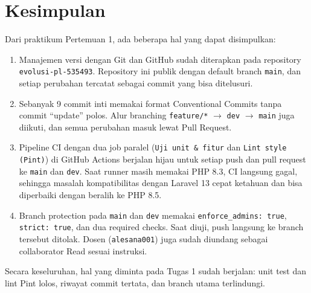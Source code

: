 \documentclass[a4paper,oneside,12pt]{report}
\begin{document}
\clearpage

\chapter{Kesimpulan}
Dari praktikum Pertemuan 1, ada beberapa hal yang dapat disimpulkan:

\begin{enumerate}
    \item Manajemen versi dengan Git dan GitHub sudah diterapkan pada repository \texttt{evolusi-pl-535493}. Repository ini publik dengan default branch \texttt{main}, dan setiap perubahan tercatat sebagai commit yang bisa ditelusuri.
    \item Sebanyak 9 commit inti memakai format Conventional Commits tanpa commit ``update'' polos. Alur branching \texttt{feature/*} $\rightarrow$ \texttt{dev} $\rightarrow$ \texttt{main} juga diikuti, dan semua perubahan masuk lewat Pull Request.
    \item Pipeline CI dengan dua job paralel (\texttt{Uji unit \& fitur} dan \texttt{Lint style (Pint)}) di GitHub Actions berjalan hijau untuk setiap push dan pull request ke \texttt{main} dan \texttt{dev}. Saat runner masih memakai PHP 8.3, CI langsung gagal, sehingga masalah kompatibilitas dengan Laravel 13 cepat ketahuan dan bisa diperbaiki dengan beralih ke PHP 8.5.
    \item Branch protection pada \texttt{main} dan \texttt{dev} memakai \texttt{enforce\_admins: true}, \texttt{strict: true}, dan dua required checks. Saat diuji, push langsung ke branch tersebut ditolak. Dosen (\texttt{alesana001}) juga sudah diundang sebagai collaborator Read sesuai instruksi.
\end{enumerate}

Secara keseluruhan, hal yang diminta pada Tugas 1 sudah berjalan: unit test dan lint Pint lolos, riwayat commit tertata, dan branch utama terlindungi.
\end{document}
